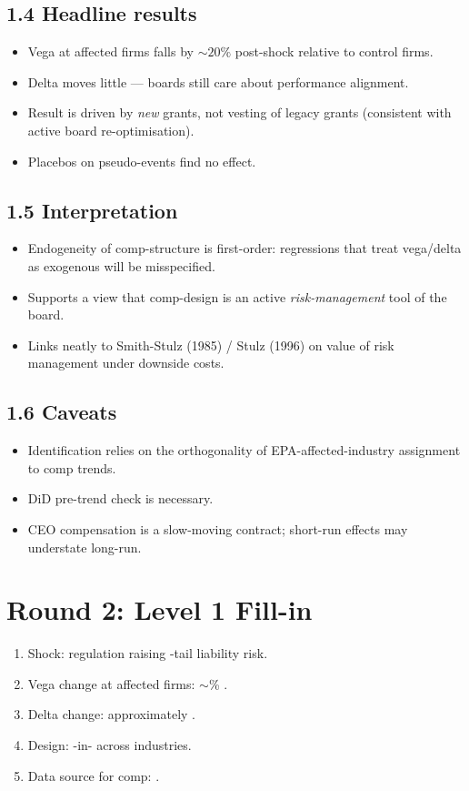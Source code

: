 \documentclass[11pt]{article}
\newcommand{\blank}[1]{\underline{\hspace{#1}}}
\begin{document}
\subsection*{1.4 Headline results}
\begin{itemize}
\item Vega at affected firms falls by $\sim 20\%$ post-shock relative to control firms.
\item Delta moves little --- boards still care about performance alignment.
\item Result is driven by \emph{new} grants, not vesting of legacy grants (consistent with active board re-optimisation).
\item Placebos on pseudo-events find no effect.
\end{itemize}

\subsection*{1.5 Interpretation}
\begin{itemize}
\item Endogeneity of comp-structure is first-order: regressions that treat vega/delta as exogenous will be misspecified.
\item Supports a view that comp-design is an active \emph{risk-management} tool of the board.
\item Links neatly to Smith-Stulz (1985) / Stulz (1996) on value of risk management under downside costs.
\end{itemize}

\subsection*{1.6 Caveats}
\begin{alertbox}
\begin{itemize}
\item Identification relies on the orthogonality of EPA-affected-industry assignment to comp trends.
\item DiD pre-trend check is necessary.
\item CEO compensation is a slow-moving contract; short-run effects may understate long-run.
\end{itemize}
\end{alertbox}

\section*{Round 2: Level 1 Fill-in}
\begin{enumerate}
\item Shock: \blank{1cm} regulation raising \blank{2cm}-tail liability risk.
\item Vega change at affected firms: $\sim$\blank{1cm}\% \blank{1cm}.
\item Delta change: approximately \blank{1cm}.
\item Design: \blank{1cm}-in-\blank{1cm} across industries.
\item Data source for comp: \blank{2cm}.
\end{enumerate}
\end{document}
